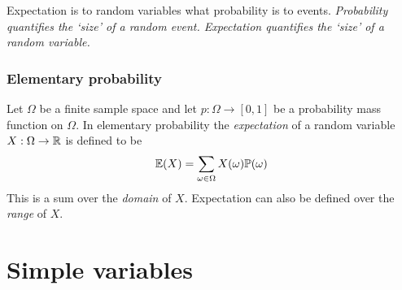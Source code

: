 
Expectation is to random variables what probability is to events. 
\bit
\it Probability quantifies the `size' of a random event.
\it Expectation quantifies the `size' of a random variable.
\eit

\subsubsection*{Elementary probability} 
Let $\Omega$ be a finite sample space and let $p:\Omega\to[0,1]$ be a probability mass function on $\Omega$. In elementary probability the \emph{expectation} of a random variable $X:\Omega\to\mathbb{R}$ is defined to be
\[
\mathbb{E}(X) = \sum_{\omega\in\Omega} X(\omega)\mathbb{P}(\omega)
\]
This is a sum over the \emph{domain} of $X$. Expectation can also be defined over the \emph{range} of $X$.

%
%
%
%

\section{Simple variables}\label{sec:expe-simple}

